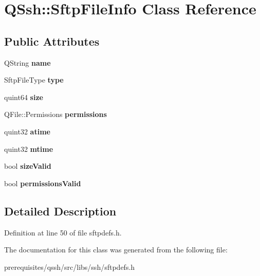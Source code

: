 \hypertarget{class_q_ssh_1_1_sftp_file_info}{}\section{Q\+Ssh\+:\+:Sftp\+File\+Info Class Reference}
\label{class_q_ssh_1_1_sftp_file_info}
\subsection*{Public Attributes}
\begin{DoxyCompactItemize}
\item 
\mbox{\label{class_q_ssh_1_1_sftp_file_info_a0540dd63f0e49fb291abcf6c3c14f400}} 
Q\+String {\bfseries name}
\item 
\mbox{\label{class_q_ssh_1_1_sftp_file_info_af5d4874897dde67ad072d491b7c56996}} 
Sftp\+File\+Type {\bfseries type}
\item 
\mbox{\label{class_q_ssh_1_1_sftp_file_info_a60da0d9f965e78f71dd6c770378676e1}} 
quint64 {\bfseries size}
\item 
\mbox{\label{class_q_ssh_1_1_sftp_file_info_ab919c888c0b0e52d9960aca24e03331e}} 
Q\+File\+::\+Permissions {\bfseries permissions}
\item 
\mbox{\label{class_q_ssh_1_1_sftp_file_info_a316bba60e7afa0c39d11cd3464b6dea9}} 
quint32 {\bfseries atime}
\item 
\mbox{\label{class_q_ssh_1_1_sftp_file_info_a236113a29059173442566cc52e120427}} 
quint32 {\bfseries mtime}
\item 
\mbox{\label{class_q_ssh_1_1_sftp_file_info_a3e93e38208a58305cc6ff7552cd0f55c}} 
bool {\bfseries size\+Valid}
\item 
\mbox{\label{class_q_ssh_1_1_sftp_file_info_aae25d2c4bb3567168e1f74f4c1c7d137}} 
bool {\bfseries permissions\+Valid}
\end{DoxyCompactItemize}


\subsection{Detailed Description}


Definition at line 50 of file sftpdefs.\+h.



The documentation for this class was generated from the following file\+:\begin{DoxyCompactItemize}
\item 
prerequisites/qssh/src/libs/ssh/sftpdefs.\+h\end{DoxyCompactItemize}

